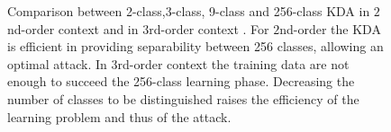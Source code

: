 \begin{figure}[t]
\caption[Comparison between 2-class,3-class, 9-class and 256-class KDA.]{Comparison between 2-class,3-class, 9-class and 256-class KDA in $2$nd-order context  and in $3$rd-order context . For $2$nd-order the KDA is efficient in providing separability between 256 classes, allowing an optimal attack. In $3$rd-order context the training data are not enough to succeed the 256-class learning phase. Decreasing the number of classes to be distinguished raises the efficiency of the learning problem and thus of the attack.}\label{fig:numClasses}
\end{figure}

